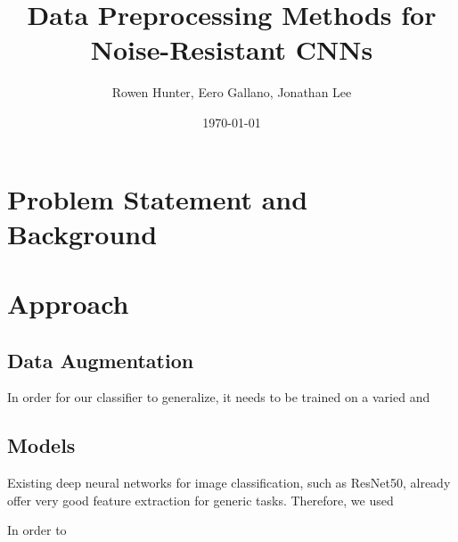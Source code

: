 \documentclass[justified]{article}
\begin{document}
  \title{Data Preprocessing Methods for Noise-Resistant CNNs}
  \author{Rowen Hunter, Eero Gallano, Jonathan Lee}
  \date{\today}
  \maketitle

  \section{Problem Statement and Background}

  \section{Approach}

  \subsection{Data Augmentation}

  In order for our classifier to generalize, it needs to be trained on a varied and

  \subsection{Models}

  Existing deep neural networks for image classification, such as ResNet50, already offer very good feature extraction for generic tasks.
  Therefore, we used

  In order to
\end{document}
